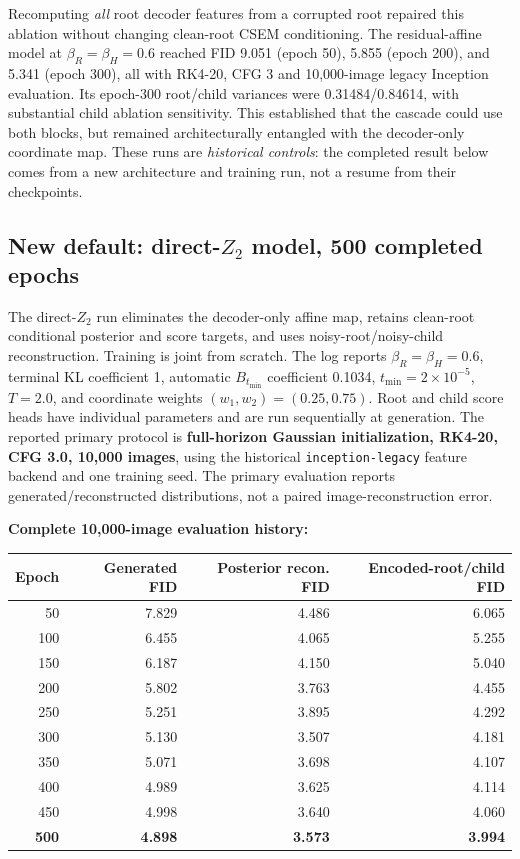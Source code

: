 \documentclass[10pt]{article}
\begin{document}
Recomputing \emph{all} root decoder features from a corrupted root repaired this ablation without changing clean-root CSEM conditioning. The residual-affine model at $\beta_R=\beta_H=0.6$ reached FID 9.051 (epoch 50), 5.855 (epoch 200), and 5.341 (epoch 300), all with RK4-20, CFG 3 and 10,000-image legacy Inception evaluation. Its epoch-300 root/child variances were 0.31484/0.84614, with substantial child ablation sensitivity. This established that the cascade could use both blocks, but remained architecturally entangled with the decoder-only coordinate map. These runs are \emph{historical controls}: the completed result below comes from a new architecture and training run, not a resume from their checkpoints.

\subsection{New default: direct-$Z_2$ model, 500 completed epochs}\label{sec:fmresult}
The direct-$Z_2$ run eliminates the decoder-only affine map, retains clean-root conditional posterior and score targets, and uses noisy-root/noisy-child reconstruction. Training is joint from scratch. The log reports $\beta_R=\beta_H=0.6$, terminal KL coefficient 1, automatic $B_{t_{\min}}$ coefficient 0.1034, $t_{\min}=2\times10^{-5}$, $T=2.0$, and coordinate weights $(w_1,w_2)=(0.25,0.75)$. Root and child score heads have individual parameters and are run sequentially at generation. The reported primary protocol is \textbf{full-horizon Gaussian initialization, RK4-20, CFG 3.0, 10,000 images}, using the historical \texttt{inception-legacy} feature backend and one training seed. The primary evaluation reports generated/reconstructed distributions, not a paired image-reconstruction error.

\textbf{Complete 10,000-image evaluation history:}
\begin{center}
\begin{tabular}{@{}rrrr@{}}
\toprule
Epoch & Generated FID & Posterior recon. FID & Encoded-root/child FID\\
\midrule
50 & 7.829 & 4.486 & 6.065\\
100 & 6.455 & 4.065 & 5.255\\
150 & 6.187 & 4.150 & 5.040\\
200 & 5.802 & 3.763 & 4.455\\
250 & 5.251 & 3.895 & 4.292\\
300 & 5.130 & 3.507 & 4.181\\
350 & 5.071 & 3.698 & 4.107\\
400 & 4.989 & 3.625 & 4.114\\
450 & 4.998 & 3.640 & 4.060\\
\textbf{500} & \textbf{4.898} & \textbf{3.573} & \textbf{3.994}\\
\bottomrule
\end{tabular}
\end{center}
\end{document}

